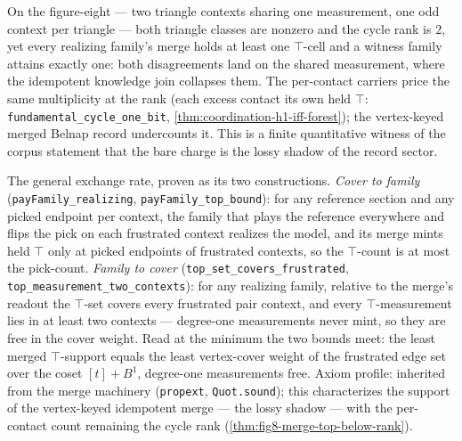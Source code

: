 \begin{theorem}\label{thm:fig8-merge-top-below-rank}\leanok{}
On the figure-eight --- two triangle contexts sharing one measurement, one
odd context per triangle --- both triangle classes are nonzero and the
cycle rank is \(2\), yet every realizing family's merge holds at least one
\(\top\)-cell and a witness family attains exactly one: both disagreements
land on the shared measurement, where the idempotent knowledge join
collapses them. The per-contact carriers price the same multiplicity at the
rank (each excess contact its own held \(\top\):
\texttt{fundamental\_cycle\_one\_bit},
\ref{thm:coordination-h1-iff-forest}); the vertex-keyed merged Belnap
record undercounts it. This is a finite quantitative witness of the corpus
statement that the bare charge is the lossy shadow of the record sector.
\end{theorem}

\begin{theorem}\label{thm:top-h1-exchange-rate}\leanok{}
The general exchange rate, proven as its two constructions. \emph{Cover to
family} (\texttt{payFamily\_realizing}, \texttt{payFamily\_top\_bound}):
for any reference section and any picked endpoint per context, the family that
plays the reference everywhere and flips the pick on each frustrated context
realizes the model, and its merge mints held \(\top\) only at picked
endpoints of frustrated contexts, so the \(\top\)-count is at most the
pick-count. \emph{Family to cover}
(\texttt{top\_set\_covers\_frustrated},
\texttt{top\_measurement\_two\_contexts}): for any realizing family,
relative to the merge's readout the \(\top\)-set covers every frustrated
pair context, and every \(\top\)-measurement lies in at least two contexts
--- degree-one measurements never mint, so they are free in the cover weight.
Read at the minimum the two bounds meet: the least merged \(\top\)-support
equals the least vertex-cover weight of the frustrated edge set over the coset
\([t] + B^1\), degree-one measurements free.
Axiom profile: inherited
from the merge machinery (\texttt{propext}, \texttt{Quot.sound}); this
characterizes the support of the vertex-keyed idempotent merge --- the lossy
shadow --- with the per-contact count remaining the cycle rank
(\cref{thm:fig8-merge-top-below-rank}).
\end{theorem}

